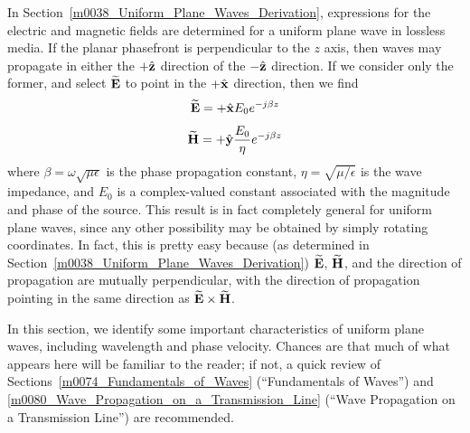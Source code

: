 

\label{m0039_Uniform_Plane_Waves_Characteristics} %

In Section~\ref{m0038_Uniform_Plane_Waves_Derivation}, expressions for the electric and magnetic fields are determined for a uniform plane wave in lossless media.
If the planar phasefront
is perpendicular to the $z$ axis, then waves may propagate in either the $+\hat{\bf z}$ direction of the $-\hat{\bf z}$ direction.  
If we consider only the former, and select $\widetilde{\bf E}$ to point in the $+\hat{\bf x}$ direction, then we find
%
\begin{equation}
\widetilde{\bf E} = +\hat{\bf x}E_0 e^{-j\beta z}
\label{m0039_eE}
\end{equation}
%
\begin{equation}
\widetilde{\bf H} = +\hat{\bf y}\frac{E_0}{\eta} e^{-j\beta z}
\label{m0039_eH}
\end{equation}
%
where 
$\beta=\omega\sqrt{\mu\epsilon}$ is the phase propagation constant,
$\eta=\sqrt{\mu/\epsilon}$ is the wave impedance, and
$E_0$ is a complex-valued constant associated with the magnitude and phase of the source.
This result is in fact completely general for uniform plane waves, since any other possibility may be obtained by simply rotating coordinates.  
In fact, this is pretty easy because (as determined in Section~\ref{m0038_Uniform_Plane_Waves_Derivation}) $\widetilde{\bf E}$, $\widetilde{\bf H}$, and the direction of propagation are mutually perpendicular, with the direction of propagation pointing in the same direction as $\widetilde{\bf E} \times \widetilde{\bf H}$.

In this section, we identify some important characteristics of uniform plane waves, including wavelength and phase velocity.  
Chances are that much of what appears here will be familiar to the reader; if not, a quick review of Sections~\ref{m0074_Fundamentals_of_Waves} (``Fundamentals of Waves'') and \ref{m0080_Wave_Propagation_on_a_Transmission_Line} (``Wave Propagation on a Transmission Line'') are recommended.

